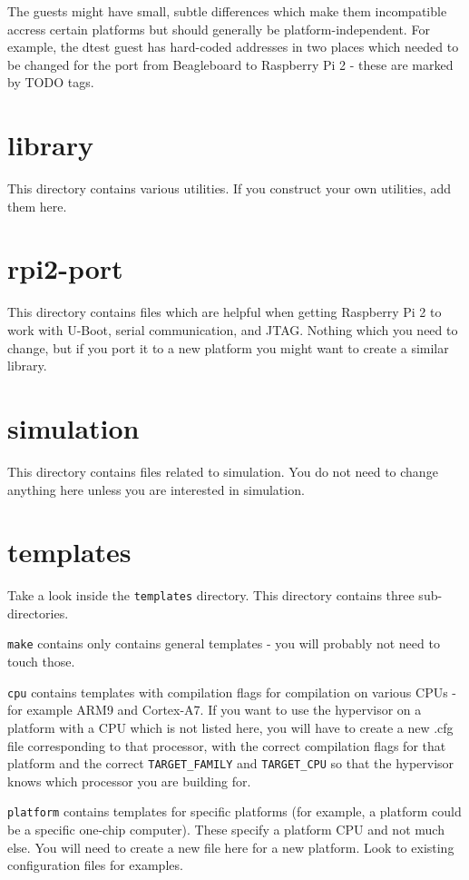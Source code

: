 \documentclass[a4paper,11pt,reqno]{amsart}
\begin{document}
The guests might have small, subtle differences which make them incompatible accress certain platforms but should generally be platform-independent. For example, the dtest guest has hard-coded addresses in two places which needed to be changed for the port from Beagleboard to Raspberry Pi 2 - these are marked by TODO tags.

\section{library}
This directory contains various utilities. If you construct your own utilities, add them here.

\section{rpi2-port}
This directory contains files which are helpful when getting Raspberry Pi 2 to work with U-Boot, serial communication, and JTAG. Nothing which you need to change, but if you port it to a new platform you might want to create a similar library.

\section{simulation}

This directory contains files related to simulation. You do not need to change anything here unless you are interested in simulation.

\section{templates}
Take a look inside the \texttt{templates} directory. This directory contains three sub-directories.

\texttt{make} contains only contains general templates - you will probably not need to touch those.

\texttt{cpu} contains templates with compilation flags for compilation on various CPUs - for example ARM9 and Cortex-A7. If you want to use the hypervisor on a platform with a CPU which is not listed here, you will have to create a new .cfg file corresponding to that processor, with the correct compilation flags for that platform and the correct \texttt{TARGET_FAMILY} and \texttt{TARGET_CPU} so that the hypervisor knows which processor you are building for.

\texttt{platform} contains templates for specific platforms (for example, a platform could be a specific one-chip computer). These specify a platform CPU and not much else. You will need to create a new file here for a new platform. Look to existing configuration files for examples.
\end{document}

